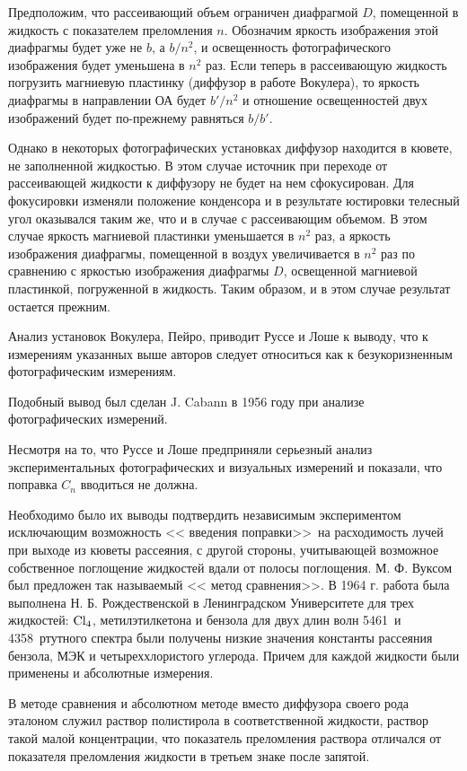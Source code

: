 Предположим, что рассеивающий объем ограничен диафрагмой $D$, помещенной в жидкость с показателем преломления $n$. Обозначим яркость изображения этой диафрагмы будет уже не $b$, а $b/n^2$, и освещенность фотографического изображения будет уменьшена в $n^2$ раз. Если теперь в рассеивающую жидкость погрузить магниевую пластинку (диффузор в работе Вокулера), то яркость диафрагмы в направлении ОА будет $b'/n^2$ и отношение освещенностей двух изображений будет по-прежнему равняться $b/b'$.

Однако в некоторых фотографических установках диффузор находится в кювете, не заполненной жидкостью. В этом случае источник при переходе от рассеивающей жидкости к диффузору не будет на нем сфокусирован. Для фокусировки изменяли положение конденсора и в результате юстировки телесный угол оказывался таким же, что  и в случае с рассеивающим объемом. В этом случае яркость магниевой пластинки уменьшается в $n^2$ раз, а яркость изображения диафрагмы, помещенной в воздух увеличивается в $n^2$ раз по сравнению с яркостью изображения диафрагмы $D$, освещенной магниевой пластинкой, погруженной в жидкость. Таким образом, и в этом случае результат остается прежним.

Анализ установок Вокулера, Пейро, приводит Руссе и Лоше к выводу, что к измерениям указанных выше авторов следует относиться как к безукоризненным фотографическим измерениям.

Подобный вывод был сделан J. Cabann в 1956 году при анализе фотографических измерений.

Несмотря на то, что Руссе и Лоше предприняли серьезный анализ экспериментальных фотографических и визуальных измерений и показали, что поправка $C_n$ вводиться не должна.

Необходимо было их выводы подтвердить независимым экспериментом исключающим возможность << введения поправки>>\ на расходимость лучей при выходе из кюветы рассеяния, с другой стороны, учитывающей возможное собственное поглощение жидкостей вдали от полосы поглощения. М. Ф. Вуксом был предложен так называемый << метод сравнения>>. В 1964 г. работа была выполнена Н. Б. Рождественской в Ленинградском Университете для трех жидкостей: $\rm Cl_4$, метилэтилкетона и бензола для двух длин волн 5461\angst\ и 4358\angst\ ртутного спектра были получены низкие значения константы рассеяния бензола, МЭК и четыреххлористого углерода.
Причем для каждой жидкости были применены и абсолютные измерения.

В методе сравнения и абсолютном методе вместо диффузора своего рода эталоном служил раствор полистирола в соответственной жидкости, раствор такой малой концентрации, что показатель преломления раствора отличался от показателя преломления жидкости в третьем знаке после запятой.

